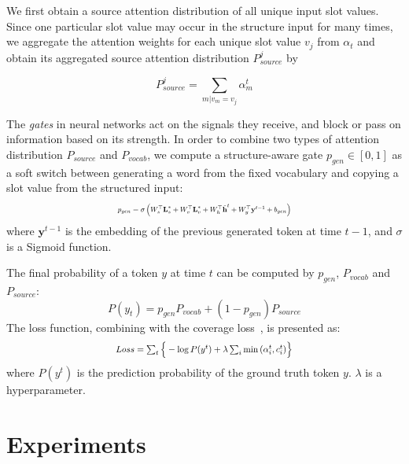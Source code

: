 \documentclass[11pt,a4paper]{article}
\begin{document}
We first obtain a source attention distribution of all unique input slot values. Since one particular slot value may occur in the structure input for many times, we aggregate the attention weights for each unique slot value $v_j$ from $\alpha_t$ and obtain its aggregated source attention distribution $P_{source}^{j}$ by

\begin{displaymath}
P_{source}^{j} = \sum_{m|v_m=v_j} \alpha^{t}_{m}
\label{eq2}
\end{displaymath}


The \emph{gates} in neural networks act on the signals they receive, and block or pass on information based on its strength. In order to combine two types of attention distribution $P_{source}$ and $P_{vocab}$, we compute a structure-aware gate $p_{gen}\in[0,1]$ as a soft switch between generating a word from the fixed vocabulary and copying a slot value from the structured input:
\begin{multline*}
\resizebox{.47 \textwidth}{!}{
$p_{gen} = \sigma\left( W^{\top}_s \textbf{L}_{s}^{*} + W^{\top}_v \textbf{L}_{v}^{*} + W^{\top}_h \tilde{\textbf{h}}^{t} + W^{\top}_y \textbf{y}^{t-1} + b_{gen}\right)$
}
\end{multline*}
where $\textbf{y}^{t-1}$ is the embedding of the previous generated token at time $t-1$, and $\sigma$ is a Sigmoid function.


The final probability of a token $y$ at time $t$ can be computed by $p_{gen}$, $P_{vocab}$ and $P_{source}$:
\begin{displaymath}
P(y_t) = p_{gen}P_{vocab}+(1-p_{gen})P_{source}
\end{displaymath}
The loss function, combining with the coverage loss~\citep{hybridp17}, is presented as:
\begin{displaymath}
\resizebox{.48 \textwidth}{!}{
$Loss = \sum\nolimits_{t} \Big\{-\log{P(y^{t})}+\lambda\sum\nolimits_{i}\min{\left(\alpha^t_i,c^t_i\right)}\Big\}$
}
\end{displaymath}
where $P(y^t)$ is the prediction probability of the ground truth token $y$. $\lambda$ is a hyperparameter.


%
 \section{Experiments}
\end{document}
